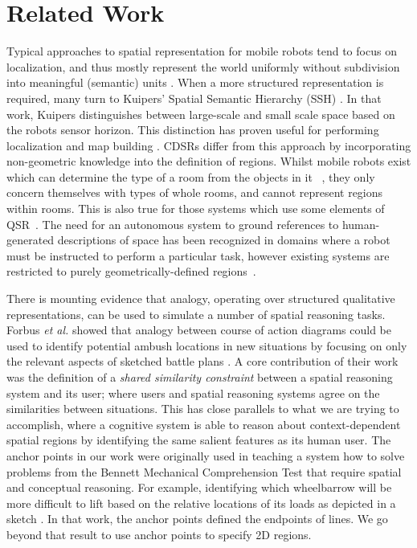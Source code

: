 \documentclass[letterpaper]{article}
\begin{document}
\section{Related Work}


Typical approaches to spatial representation for mobile robots tend to focus on localization, and thus mostly represent the world uniformly without subdivision into meaningful (semantic) units \cite{Thrun02a}. When a more structured representation is required, many turn to Kuipers' Spatial Semantic Hierarchy (SSH) \cite{Kuipers:2000}. In that work, Kuipers distinguishes between large-scale and small scale space based on the robots sensor horizon. This distinction has proven useful for performing localization and map building \cite{Beeson01042010}. CDSRs differ from this approach by incorporating non-geometric knowledge into the definition of regions. Whilst mobile robots exist which can determine the type of a room from the objects in it ~\cite{Hanheide/etal:2010a,Galindo/etal:2005a}, they only concern themselves with types of whole rooms, and cannot represent regions within rooms. This is also true for those systems which use some elements of QSR~\cite{aydemir2011icra}. The need for an autonomous system to ground references to human-generated descriptions of space has been recognized in domains where a robot must be instructed to perform a particular task, however existing systems are restricted to purely geometrically-defined regions~\cite{Tellex:2011,Dzifcak/etal:2009,brenneretal07ijcai}.


There is mounting evidence that analogy, operating over structured qualitative representations, can be used to simulate a number of spatial reasoning tasks. Forbus \textit{et al.} showed that analogy between course of action diagrams could be used to identify potential ambush locations in new situations by focusing on only the relevant aspects of sketched battle plans \cite{Forbus/etal2003}. A core contribution of their work was the definition of a \textit{shared similarity constraint} between a spatial reasoning system and its user; where users and spatial reasoning systems agree on the similarities between situations. This has close parallels to what we are trying to accomplish, where a cognitive system is able to reason about context-dependent spatial regions by identifying the same salient features as its human user. The anchor points in our work were originally used in teaching a system how to solve problems from the Bennett Mechanical Comprehension Test that require spatial and conceptual reasoning. For example, identifying which wheelbarrow will be more difficult to lift based on the relative locations of its loads as depicted in a sketch \cite{Klenk/etal2011}. In that work, the anchor points defined the endpoints of lines. We go beyond that result to use anchor points to specify 2D regions.  
\end{document}
